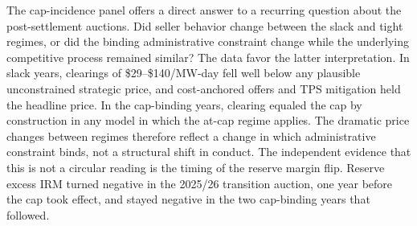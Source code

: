 The cap-incidence panel offers a direct answer to a recurring question
about the post-settlement auctions. Did seller behavior change between
the slack and tight regimes, or did the binding administrative
constraint change while the underlying competitive process remained
similar? The data favor the latter interpretation. In slack years,
clearings of \$29--\$140/MW-day fell well below any plausible
unconstrained strategic price, and cost-anchored offers and TPS
mitigation held the headline price. In the cap-binding years,
clearing equaled the cap by construction in any model in which the
at-cap regime applies. The dramatic price changes between regimes
therefore reflect a change in which administrative
constraint binds, not a structural shift in conduct. The independent
evidence that this is not a circular reading is the timing of
the reserve margin flip. Reserve excess IRM turned negative in the
2025/26 transition auction, one year before the cap took effect, and
stayed negative in the two cap-binding years that followed.
